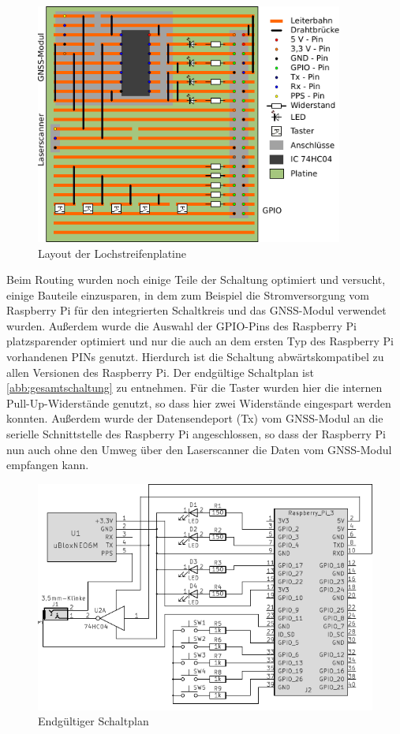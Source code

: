 \documentclass[a4paper,12pt,bibliography=totoc, listof=totoc,titlepage,pointlessnumbers]{scrreprt}
\begin{document}
\begin{figure}
 \centering
 \includegraphics[width=0.9\textwidth]{img/platine.pdf}
 \caption{Layout der Lochstreifenplatine}
 \label{abb:platine}
\end{figure}

Beim Routing wurden noch einige Teile der Schaltung optimiert und versucht, einige Bauteile einzusparen, in dem zum Beispiel die Stromversorgung vom Raspberry Pi für den integrierten Schaltkreis und das GNSS-Modul verwendet wurden. Außerdem wurde die Auswahl der GPIO-Pins des Raspberry Pi platzsparender optimiert und nur die auch an dem ersten Typ des Raspberry Pi vorhandenen PINs genutzt. Hierdurch ist die Schaltung abwärtskompatibel zu allen Versionen des Raspberry Pi. Der endgültige Schaltplan ist \autoref{abb:gesamtschaltung} zu entnehmen. Für die Taster wurden hier die internen Pull-Up-Widerstände genutzt, so dass hier zwei Widerstände eingespart werden konnten. Außerdem wurde der Datensendeport (Tx) vom GNSS-Modul an die serielle Schnittstelle des Raspberry Pi angeschlossen, so dass der Raspberry Pi nun auch ohne den Umweg über den Laser\-scan\-ner die Daten vom GNSS-Modul empfangen kann.

\begin{figure}
 \centering
 \includegraphics[width=1\textwidth]{img/schaltplanGesamt.pdf}
 \caption{Endgültiger Schaltplan}
 \label{abb:gesamtschaltung}
\end{figure}
\end{document}
